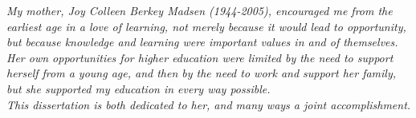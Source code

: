 


\newpage
\thispagestyle{empty}
\vfill
\begin{center}
\begin{minipage}[h]{\textwidth}
 \begin{center}
  \vspace{8cm}
  \vfill
  \textit{My mother, Joy Colleen Berkey Madsen (1944-2005),  encouraged me from the earliest age in a love of learning, not merely because it would lead to opportunity, but because knowledge and learning were important values in and of themselves.  Her own  opportunities for higher education were limited by the need to support herself from a young age, and then by the need to work and support her family, but she supported my education in every way possible.}\\
  \vspace{1cm}
  \textit{This dissertation is both dedicated to her, and many ways a joint accomplishment.}
  \vfill
 \end{center}
\end{minipage}
\end{center}
